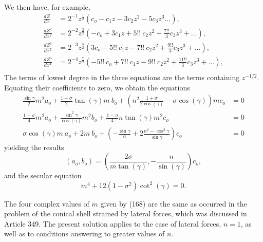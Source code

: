 We then have, for example,
\begin{align*}
\frac{dZ}{dx} &= 2^{-1} z^{\frac{1}{2} }
(c_o - c_1 z - 3 c_2 z^2 - 5 c_3 z^3 \ldots),\\
\frac{dZ^2}{dx^2} &= 2^{-2}z^{\frac{3}{2} }
(-c_o + 3 c_1 z + 5!! ~c_2 z^2 + \frac{7!!}{3} c_3 z^3 + \ldots),\\
\frac{dZ^3}{dx^3} &= 2^{-3} z^{\frac{5}{2} }
(3c_o - 5!! ~c_1 z - 7!! ~c_2 z^2 + \frac{9!!}{3} c_3 z^3 + \ldots),\\
\frac{dZ^4}{dx^4} &= 2^{-4}z^{\frac{7}{2} }
(- 5!! ~c_o + 7!! ~c_1 z - 9!! ~c_2 z^2 + \frac{11!!}{3} c_3 z^3 +\ldots),\\
\end{align*}
The terms of lowest degree in the three
equations are the terms containing \(z^{-1/2}\).
Equating their coefficients to zero,
we obtain the equations
\begin{align}
\frac{\sin \gamma }{2} m^2 a_o + \frac{1+ \sigma }{2}
\tan(\gamma) m~b_o+ \left( n^2 \frac{1+ \sigma }{2 \cos(\gamma) }
- \sigma \cos(\gamma) \right) m c_o & = 0 \nonumber \\
\frac{1-\sigma }{4} m^2 a_o + \frac{\sin^2 \gamma }{\cos(\gamma) } m^2 b_o+
\frac{1-\sigma }{4} n \tan(\gamma) m^2 c_o & = 0 \nonumber \\
\sigma \cos(\gamma) m~a_o + 2 m~b_o+
\left(
-\frac{\sin \gamma}{6} + 2 \frac{n^2 - \cos^2 \gamma }{\sin \gamma }
\right)c_o & = 0 \label{eq166}
\end{align}
yielding the results
\begin{equation}\label{eq167}
(a_o,b_o) = \left(\frac{2 \sigma }{m \tan(\gamma)}, -\frac{n}{\sin(\gamma)}\right) c_o,
\end{equation}
and the secular equation
\begin{equation}\label{eq168}
m^4 +12(1-\sigma^2) \cot^2(\gamma) =0.
\end{equation}

The four complex values of \(m\) given by (168)
are the same as occurred in the problem of
the conical shell strained by lateral forces,
which was discussed in Article 349. The
present solution applies to the case of
lateral forces, \(n=1\), as well as to conditions
answering to greater values of \(n\).

